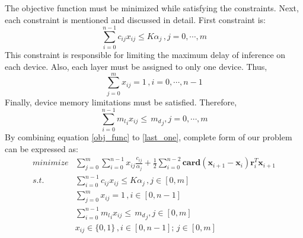 \documentclass[lettersize,journal]{IEEEtran}
\begin{document}
The objective function must be minimized while satisfying the constraints. Next, each constraint is mentioned and discussed in detail. First constraint is:
\begin{equation}
\sum_{i=0}^{n-1} c_{ij} x_{ij} \leq K \alpha_j \, , j=0, \cdots, m
\end{equation}
This constraint is responsible for limiting the maximum delay of inference on each device. Also, each layer must be assigned to only one device. Thus,
\begin{equation}
\sum_{j=0}^{m} x_{ij} = 1 \, , i=0, \cdots, n-1
\end{equation}
Finally, device memory limitations must be satisfied. Therefore,
\begin{equation}
\label{last_one}
\sum_{i=0}^{n-1} {m_l}_i x_{ij} \leq \, {m_d}_j  , j=0, \cdots, m
\end{equation}
By combining equation \ref{obj_func} to \ref{last_one}, complete form of our problem can be expressed as:
\begin{align}
\label{initial_form}
minimize &\sum_{j=0}^{m}\sum_{i=0}^{n-1} x_{ij}\frac{c_{ij}}{\alpha_j} + \frac{1}{2}\sum_{i=0}^{n-2}\mathrm{\textbf{card}}(\boldsymbol{x}_{i+1}-\boldsymbol{x}_i)\boldsymbol{r}_i^T \boldsymbol{x}_{i+1} \\
s.t. \quad & \sum_{i=0}^{n-1} c_{ij} x_{ij} \leq K \alpha_j \, , j \in [0, m] \nonumber \\
\quad & \sum_{j=0}^{m} x_{ij} = 1 \, , i \in [0, n-1] \nonumber \\
\quad & \sum_{i=0}^{n-1} {m_l}_i x_{ij} \leq \, {m_d}_j  , j \in [0, m] \nonumber \\
\quad & x_{ij} \in \{0,1\} \, , i \in [0, n-1]; \, j \in [0, m] \nonumber
\end{align}
\end{document}
